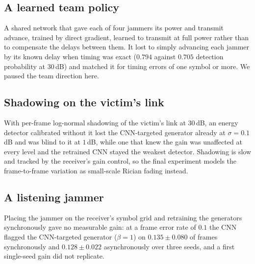 

\subsection{A learned team policy}
A shared network that gave each of four jammers its power and transmit advance, trained by direct gradient, learned to transmit at full power rather than to compensate the delays between them.
It lost to simply advancing each jammer by its known delay when timing was exact ($0.794$ against $0.705$ detection probability at $30$\,dB) and matched it for timing errors of one symbol or more.
We paused the team direction here.

\subsection{Shadowing on the victim's link}
With per-frame log-normal shadowing of the victim's link at $30$\,dB, an energy detector calibrated without it lost the CNN-targeted generator already at $\sigma=0.1$\,dB and was blind to it at $1$\,dB, while one that knew the gain was unaffected at every level and the retrained CNN stayed the weakest detector.
Shadowing is slow and tracked by the receiver's gain control, so the final experiment models the frame-to-frame variation as small-scale Rician fading instead.

\subsection{A listening jammer}
Placing the jammer on the receiver's symbol grid and retraining the generators synchronously gave no measurable gain: at a frame error rate of $0.1$ the CNN flagged the CNN-targeted generator ($\beta=1$) on $0.135\pm0.080$ of frames synchronously and $0.128\pm0.022$ asynchronously over three seeds, and a first single-seed gain did not replicate.

